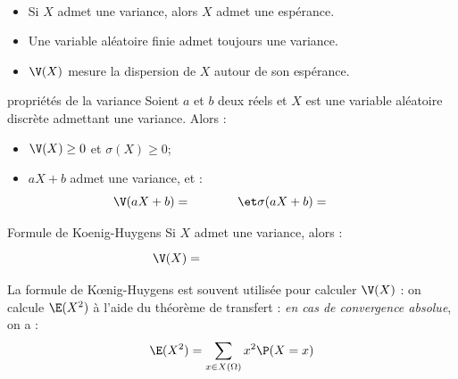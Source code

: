 \documentclass[french,11pt,twoside]{VcCours}
\begin{document}
\newpage

$\phantom{}$
\begin{Demonstration}{} 

\vspace{4cm}
\end{Demonstration}

\begin{Remarques}{}
\begin{itemize} 
\item Si $X$ admet une variance, alors $X$ admet une espérance.
\item Une variable aléatoire finie admet toujours une variance.
\item $\V(X)$ mesure la dispersion de $X$ autour de son espérance.
\end{itemize}
\end{Remarques}

\begin{Proposition}{propriétés de la variance}
Soient $a$ et $b$ deux réels et $X$ est une variable aléatoire discrète admettant une variance. Alors :
\begin{itemize}
 \item $\V(X) \geq 0$ et $\sigma(X) \geq 0$;
 \item $aX+b$ admet une variance, et :  
$$\V(aX+b) = \phantom{a^2 \V(X)} \et \sigma(aX+b) = \phantom{\vert a \vert \sigma(X)} $$
\end{itemize}
\end{Proposition}

\begin{Demonstration}{}

\vspace{5cm}
\end{Demonstration}

\begin{Proposition}{Formule de Koenig-Huygens}
Si $X$ admet une variance, alors :
$$\V(X) = \phantom{\E\big(X^2\big) - \big(\E(X)\big)^2}$$
\end{Proposition}

\begin{Demonstration}{}
\vspace{3cm}
\end{Demonstration}

\begin{Methode}{} 
La formule de Kœnig-Huygens est souvent utilisée pour calculer $\V(X)$ : on calcule $\E(X^2)$ à l'aide du {théorème de transfert} : \emph{en cas de convergence absolue}, on a : 
$$\E(X^2)=\sum\limits_{x\in X(\Omega)} x^2  \P(X=x)$$
\end{Methode}
\end{document}

